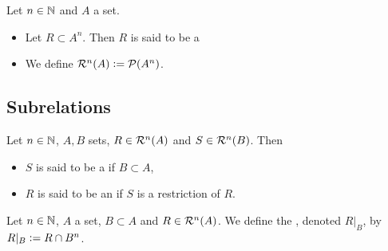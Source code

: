 \begin{defn}
	Let $n \in \mathbb{N}$ and $A$ a set. 
	\begin{itemize}
		\item Let $R \subset A^n$. Then $R$ is said to be a 
		\item We define $\mathcal{R}^n(A) \vcentcolon= \mathcal{P}(A^n)$.
	\end{itemize} 
\end{defn}


















































\subsection{Subrelations}

\begin{defn}
	Let $n \in \mathbb{N}$, $A, B$ sets, $R \in \mathcal{R}^n(A)$ and $S \in \mathcal{R}^n(B)$. Then 
	\begin{itemize}
		\item $S$ is said to be a  if $B \subset A$,    
		\item $R$ is said to be an  if $S$ is a restriction of $R$.
	\end{itemize}
\end{defn}


\begin{defn}
	Let $n \in \mathbb{N}$, $A$ a set, $B \subset A$ and $R \in \mathcal{R}^n(A)$. We define the , denoted $R|_B$, by $R|_B \vcentcolon= R \cap B^n$.
\end{defn}


